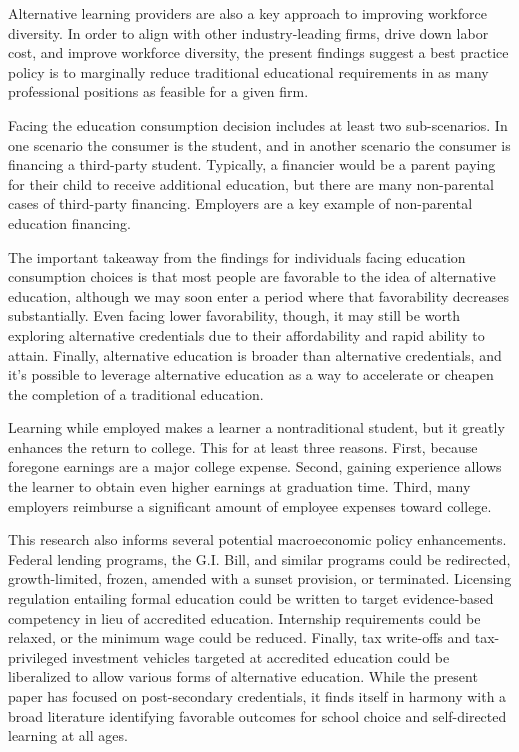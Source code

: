\documentclass[AER]{/Users/zyl357/Documents/GitHub/research-dissertation-case-for-alt-ed/papers/alt-ed-survey/aea-latex-templates/AEA}
\begin{document}
Alternative learning providers are also a key approach to improving
workforce diversity. In order to align with other industry-leading firms,
drive down labor cost, and improve workforce diversity, the present
findings suggest a best practice policy is to marginally reduce
traditional educational requirements in as many professional positions as
feasible for a given firm.

Facing the education consumption decision includes at least two
sub-scenarios. In one scenario the consumer is the student, and in another
scenario the consumer is financing a third-party student. Typically, a
financier would be a parent paying for their child to receive additional
education, but there are many non-parental cases of third-party financing.
Employers are a key example of non-parental education financing.

The important takeaway from the findings for individuals facing education
consumption choices is that most people are favorable to the idea of
alternative education, although we may soon enter a period where that
favorability decreases substantially. Even facing lower favorability,
though, it may still be worth exploring alternative credentials due to
their affordability and rapid ability to attain. Finally, alternative
education is broader than alternative credentials, and it’s possible to
leverage alternative education as a way to accelerate or cheapen the
completion of a traditional education.

Learning while employed makes a learner a nontraditional student, but it
greatly enhances the return to college. This for at least three reasons.
First, because foregone earnings are a major college expense. Second,
gaining experience allows the learner to obtain even higher earnings at
graduation time. Third, many employers reimburse a significant amount of
employee expenses toward college.

This research also informs several potential macroeconomic policy
enhancements. Federal lending programs, the G.I. Bill, and similar
programs could be redirected, growth-limited, frozen, amended with a
sunset provision, or terminated. Licensing regulation entailing formal
education could be written to target evidence-based competency in lieu of
accredited education. Internship requirements could be relaxed, or the
minimum wage could be reduced. Finally, tax write-offs and tax-privileged
investment vehicles targeted at accredited education could be liberalized
to allow various forms of alternative education. While the present paper
has focused on post-secondary credentials, it finds itself in harmony with
a broad literature identifying favorable outcomes for school choice and
self-directed learning at all ages.
\end{document}
